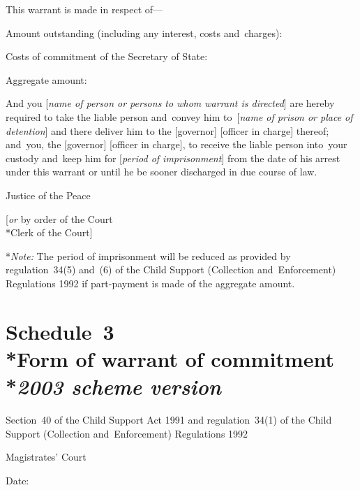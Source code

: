 \documentclass[12pt,a4paper]{article}
\begin{document}
This warrant is made in respect of---

Amount outstanding (including any interest, costs and~charges):

Costs of commitment of the Secretary of State:

\medskip

Aggregate amount:

\medskip

And you [\emph{name of person or persons to whom warrant is directed}] are hereby required to take the liable person and~convey him to~[\emph{name of prison or place of detention}] and there deliver him to the [governor] [officer in charge] thereof; and~you, the [governor] [officer in charge], to receive the liable person into~your custody and~keep him for [\emph{period of imprisonment}] from the date of his arrest under this warrant or until he be sooner discharged in due course of law.

\medskip

{\raggedleft Justice of the Peace

\medskip

[\emph{or} by order of the Court\\*Clerk of the Court]

}

\medskip

*\emph{Note:} The period of imprisonment will be reduced as provided by regulation~34(5) and~(6) of the Child Support (Collection and~Enforcement) Regulations 1992 if part-payment is made of the aggregate amount.

\part[Schedule~3 --- Form of warrant of commitment --- \emph{2003 scheme version}]{Schedule~3\\*Form of warrant of commitment\\*\emph{2003 scheme version}}

\noindent
Section~40 of the Child Support Act 1991 and regulation~34(1) of the Child Support (Collection and~Enforcement) Regulations 1992

\medskip

{\raggedleft \hspace{0.5\linewidth}\dotfill Magistrates' Court

}

\medskip

Date:

\medskip
\end{document}

